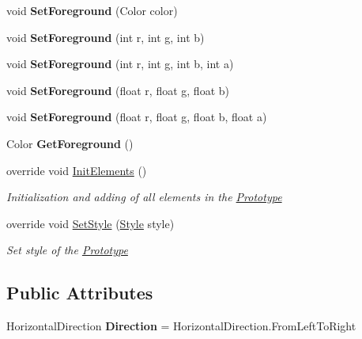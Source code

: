 \begin{DoxyCompactItemize}
\mbox{\label{class_space_v_i_l_1_1_title_bar_ac5397adc2bb169f93ebdec4e01eb6139}} 
void {\bfseries Set\+Foreground} (Color color)
\item 
\mbox{\label{class_space_v_i_l_1_1_title_bar_a16dc23e4d2803282a55ee8aadbf41999}} 
void {\bfseries Set\+Foreground} (int r, int g, int b)
\item 
\mbox{\label{class_space_v_i_l_1_1_title_bar_a80ce4acd717c586dc99b9921ad94a921}} 
void {\bfseries Set\+Foreground} (int r, int g, int b, int a)
\item 
\mbox{\label{class_space_v_i_l_1_1_title_bar_a0e5be0d6e8e6acb165d0e29bd6194560}} 
void {\bfseries Set\+Foreground} (float r, float g, float b)
\item 
\mbox{\label{class_space_v_i_l_1_1_title_bar_a0ff4b2693c246b9f792b7b277666f7bc}} 
void {\bfseries Set\+Foreground} (float r, float g, float b, float a)
\item 
\mbox{\label{class_space_v_i_l_1_1_title_bar_a239f4c7ef7246e25d6f5ccf3b2237fec}} 
Color {\bfseries Get\+Foreground} ()
\item 
override void \mbox{\hyperlink{class_space_v_i_l_1_1_title_bar_a8ee9e176f0eb7d4fcf1a4309bd8c2925}{Init\+Elements}} ()
\begin{DoxyCompactList}\small\item\em Initialization and adding of all elements in the \mbox{\hyperlink{class_space_v_i_l_1_1_prototype}{Prototype}} \end{DoxyCompactList}\item 
override void \mbox{\hyperlink{class_space_v_i_l_1_1_title_bar_aaeec14fb90014f8f6f922214958ce798}{Set\+Style}} (\mbox{\hyperlink{class_space_v_i_l_1_1_decorations_1_1_style}{Style}} style)
\begin{DoxyCompactList}\small\item\em Set style of the \mbox{\hyperlink{class_space_v_i_l_1_1_prototype}{Prototype}} \end{DoxyCompactList}\end{DoxyCompactItemize}
\subsection*{Public Attributes}
\begin{DoxyCompactItemize}
\item 
\mbox{\label{class_space_v_i_l_1_1_title_bar_a03dafd5558defb6ee796bd0e9ac62878}} 
Horizontal\+Direction {\bfseries Direction} = Horizontal\+Direction.\+From\+Left\+To\+Right
\end{DoxyCompactItemize}
